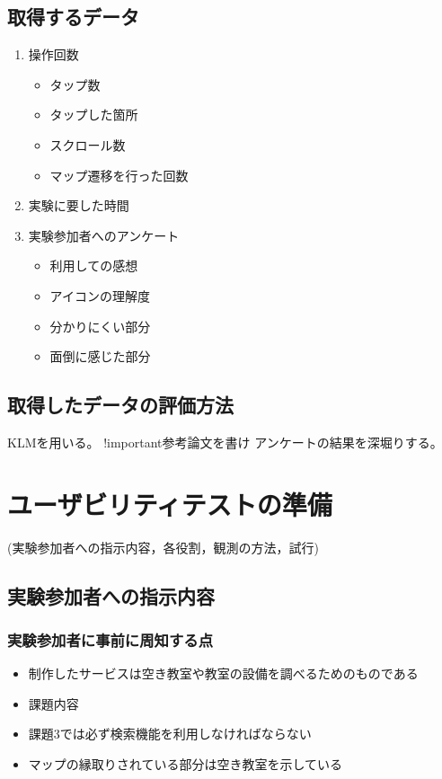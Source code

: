 \documentclass[12pt,a4paper,dvipdf]{jsarticle}
\begin{document}
\subsection{取得するデータ}
\begin{enumerate}
    \item 操作回数
          \begin{itemize}
              \item タップ数
              \item タップした箇所
              \item スクロール数
              \item マップ遷移を行った回数
          \end{itemize}
    \item 実験に要した時間
    \item 実験参加者へのアンケート
          \begin{itemize}
              \item 利用しての感想
              \item アイコンの理解度
              \item 分かりにくい部分
              \item 面倒に感じた部分
          \end{itemize}
\end{enumerate}
\subsection{取得したデータの評価方法}
KLMを用いる。
!important参考論文を書け
アンケートの結果を深堀りする。
\section{ユーザビリティテストの準備}
 (実験参加者への指示内容，各役割，観測の方法，試行)
\subsection{実験参加者への指示内容}
\subsubsection{実験参加者に事前に周知する点}
\begin{itemize}
    \item 制作したサービスは空き教室や教室の設備を調べるためのものである
    \item 課題内容
    \item 課題3では必ず検索機能を利用しなければならない
    \item マップの縁取りされている部分は空き教室を示している
\end{itemize}
\end{document}
